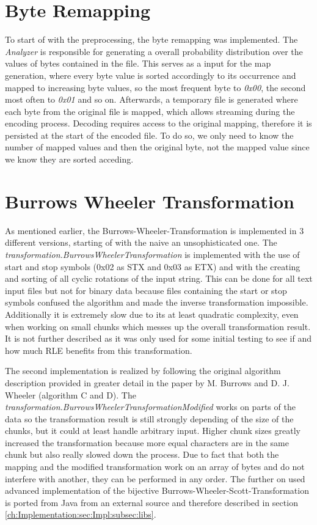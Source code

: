 \section{Byte Remapping}
\label{ch:Implementation:bytemapping}
\par{
	To start of with the preprocessing, the byte remapping was implemented. The \emph{Analyzer} is responsible for generating a overall probability distribution over the values of bytes contained in the file. This serves as a input for the map generation, where every byte value is sorted accordingly to its occurrence and mapped to increasing byte values, so the most frequent byte to \textit{0x00}, the second most often to \textit{0x01} and so on. Afterwards, a temporary file is generated where each byte from the original file is mapped, which allows streaming during the encoding process. Decoding requires access to the original mapping, therefore it is persisted at the start of the encoded file. To do so, we only need to know the number of mapped values and then the original byte, not the mapped value since we know they are sorted acceding.
}
\section{Burrows Wheeler Transformation}
\label{ch:Implementation:bwt}
\par{
	As mentioned earlier, the Burrows-Wheeler-Transformation is implemented in 3 different versions, starting of with the naive an unsophisticated one. The \emph{transformation.BurrowsWheelerTransformation} is implemented with the use of start and stop symbols (0x02 as STX and 0x03 as ETX) and with the creating and sorting of all cyclic rotations of the input string. This can be done for all text input files but not for binary data because files containing the start or stop symbols confused the algorithm and made the inverse transformation impossible. Additionally it is extremely slow due to its at least quadratic complexity, even when working on small chunks which messes up the overall transformation result. It is not further described as it was only used for some initial testing to see if and how much RLE benefits from this transformation. 
}
\par{
	The second implementation is realized by following the original algorithm description provided in greater detail in the paper by M. Burrows and D. J. Wheeler \cite{Burrows94} (algorithm C and D). The \emph{transformation.BurrowsWheelerTransformationModified} works on parts of the data so the transformation result is still strongly depending of the size of the chunks, but it could at least handle arbitrary input. Higher chunk sizes greatly increased the transformation because more equal characters are in the same chunk but also really slowed down the process. Due to fact that both the mapping and the modified transformation work on an array of bytes and do not interfere with another, they can be performed in any order. The further on used advanced implementation of the bijective Burrows-Wheeler-Scott-Transformation is ported from Java from an external source and therefore described in section \ref{ch:Implementation:sec:Impl:subsec:libs}.
}
